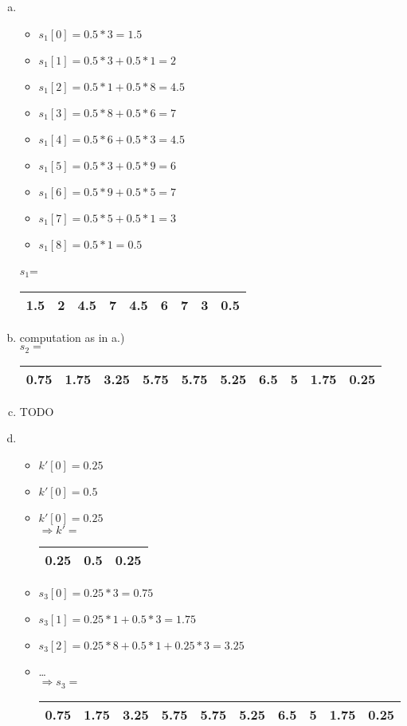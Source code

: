 \documentclass[12pt]{article}
\begin{document}

\setcounter{section}{8}
\setcounter{subsection}{0}

\subsection{ }

\begin{enumerate}[a)]
\item
\begin{itemize}
	\item $s_1[0]= 0.5 * 3 = 1.5 $
	\item $s_1[1]= 0.5 * 3 + 0.5 * 1 = 2 $
	\item $s_1[2]= 0.5 * 1 + 0.5 * 8 = 4.5 $	
	\item $s_1[3]= 0.5 * 8 + 0.5 * 6 = 7 $
	\item $s_1[4]= 0.5 * 6 + 0.5 * 3 = 4.5 $	
	\item $s_1[5]= 0.5 * 3 + 0.5 * 9 = 6 $
	\item $s_1[6]= 0.5 * 9 + 0.5 * 5 = 7 $
	\item $s_1[7]= 0.5 * 5 + 0.5 * 1 = 3 $
	\item $s_1[8]= 0.5 * 1 = 0.5 $
\end{itemize}
$s_1$=\begin{tabular}{|c|c|c|c|c|c|c|c|c|}
\hline
1.5 & 2 & 4.5 & 7 & 4.5 & 6 & 7 & 3 & 0.5\\ \hline
\end{tabular}
\item
computation as in a.) \\
$s_2=$\begin{tabular}{|c|c|c|c|c|c|c|c|c|c|}
\hline
0.75 & 1.75 & 3.25 & 5.75 & 5.75 & 5.25 & 6.5 & 5 & 1.75 & 0.25\\ \hline
\end{tabular}

\item
TODO

\item
\begin{itemize}
	\item $k'[0]=0.25$
	\item $k'[0]=0.5$
	\item $k'[0]=0.25$\\
	$\Rightarrow k'= $\begin{tabular}{|c|c|c|}
	\hline 0.25 & 0.5 & 0.25 \\ \hline
	\end{tabular}
	\item $s_3[0]= 0.25*3= 0.75$
	\item $s_3[1]= 0.25*1+0.5*3=1.75$
	\item $s_3[2]= 0.25*8+0.5*1+0.25*3=3.25$
	\item \dots \\
	$\Rightarrow s_3=$
	\begin{tabular}{|c|c|c|c|c|c|c|c|c|c|}
		\hline
		0.75 & 1.75 & 3.25 & 5.75 & 5.75 & 5.25 & 6.5 & 5 & 1.75 & 0.25\\ \hline
	\end{tabular}
\end{itemize}


\end{enumerate}
\end{document}
